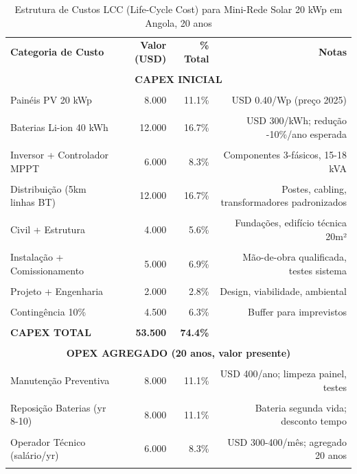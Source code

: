 \documentclass[12pt, a4paper]{article}
\begin{document}
\begin{table}[H]
\centering
\caption{Estrutura de Custos LCC (Life-Cycle Cost) para Mini-Rede Solar 20 kWp em Angola, 20 anos}
\label{tab:lcc_detailed}
\small
\begin{tabular}{lrrr}
\toprule\textbf{Categoria de Custo} &\textbf{Valor (USD)} &\textbf{\% Total} &\textbf{Notas} \\\\
\midrule
\multicolumn{4}{c}{\textbf{CAPEX INICIAL}} \\\\
\midrule
Painéis PV 20 kWp & 8.000 & 11.1\% & USD 0.40/Wp (preço 2025) \\\\
Baterias Li-ion 40 kWh & 12.000 & 16.7\% & USD 300/kWh; redução -10\%/ano esperada \\\\
Inversor + Controlador MPPT & 6.000 & 8.3\% & Componentes 3-fásicos, 15-18 kVA \\\\
Distribuição (5km linhas BT) & 12.000 & 16.7\% & Postes, cabling, transformadores padronizados \\\\
Civil + Estrutura & 4.000 & 5.6\% & Fundações, edifício técnica 20m² \\\\
Instalação + Comissionamento & 5.000 & 6.9\% & Mão-de-obra qualificada, testes sistema \\\\
Projeto + Engenharia & 2.000 & 2.8\% & Design, viabilidade, ambiental \\\\
Contingência 10\% & 4.500 & 6.3\% & Buffer para imprevistos \\\\
\midrule\textbf{CAPEX TOTAL} &\textbf{53.500} &\textbf{74.4\%} & \\\\
\midrule
\multicolumn{4}{c}{\textbf{OPEX AGREGADO (20 anos, valor presente)}} \\\\
\midrule
Manutenção Preventiva & 8.000 & 11.1\% & USD 400/ano; limpeza painel, testes \\\\
Reposição Baterias (yr 8-10) & 8.000 & 11.1\% & Bateria segunda vida; desconto tempo \\\\
Operador Técnico (salário/yr) & 6.000 & 8.3\% & USD 300-400/mês; agregado 20 anos \\\\

\end{tabular}
\end{table}
\end{document}
